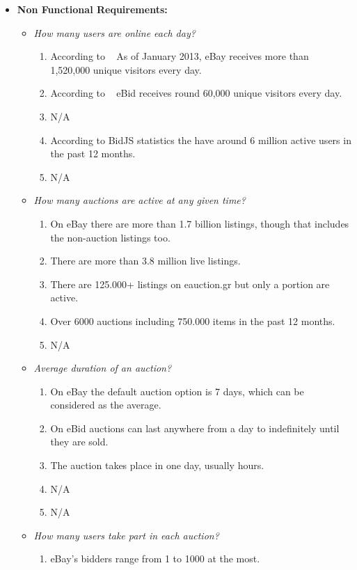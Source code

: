 \documentclass[letterpaper,twocolumn,10pt]{article}
\begin{document}
\begin{itemize}
\begin{itemize}
\end{itemize}
\item \textbf{Non Functional Requirements:}
\begin{itemize} 
\item \emph{How many users are online each day?}
    \begin{enumerate}
    \item According to ~\cite{EbayEbidStatistics} As of January 2013, eBay receives more than 1,520,000 unique visitors every day.
    \item According to ~\cite{EbayEbidStatistics} eBid receives round 60,000 unique visitors every day.
    \item N/A
    \item According to BidJS statistics the have around 6 million active users in the past 12 months.
    \item N/A
    \end{enumerate}
\item \emph{How many auctions are active at any given time?}
    \begin{enumerate}
    \item On eBay there are more than 1.7 billion listings, though that includes the non-auction listings too.
    \item There are more than 3.8 million live listings.
    \item There are 125.000+ listings on eauction.gr but only a portion are active.
    \item Over 6000 auctions including 750.000 items in the past 12 months.
    \item N/A
    \end{enumerate} 
\item \emph{Average duration of an auction?}
    \begin{enumerate}
    \item On eBay the default auction option is 7 days, which can be considered as the average.
    \item On eBid auctions can last anywhere from a day to indefinitely until they are sold.
    \item The auction takes place in one day, usually hours.
    \item N/A
    \item N/A
    \end{enumerate}    
\item \emph{How many users take part in each auction?}
    \begin{enumerate}
    \item eBay's bidders range from 1 to 1000 at the most.

\end{enumerate}
\end{itemize}
\end{itemize}
\end{document}
